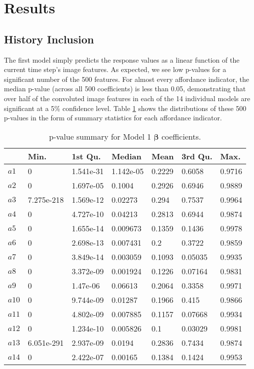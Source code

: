 \documentclass[master]{subfiles}
\begin{document}
\section{Results}\label{sec:results}
\subsection{History Inclusion}
The first model simply predicts the response values as a linear function of the current time step's image features.  As expected, we see low p-values for a significant number of the 500 features.  For almost every affordance indicator, the median p-value (across all 500 coefficients) is less than 0.05, demonstrating that over half of the convoluted image features in each of the 14 individual models are significant at a 5\% confidence level.  Table \ref{table:p1} shows the distributions of these 500 p-values in the form of summary statistics for each affordance indicator.
\begin{table}[H]
\centering
\caption{p-value summary for Model 1  $\bm{\beta}$ coefficients.}
\begin{tabular}{@{}lllllll@{}}
\toprule
    & Min.       & 1st Qu.   & Median    & Mean   & 3rd Qu. & Max.   \\ \midrule
$a1$  & 0          & 1.541e-31 & 1.142e-05 & 0.2229 & 0.6058  & 0.9716 \\
$a2$  & 0          & 1.697e-05 & 0.1004    & 0.2926 & 0.6946  & 0.9889 \\
$a3$  & 7.275e-218 & 1.569e-12 & 0.02273   & 0.294  & 0.7537  & 0.9964 \\
$a4$  & 0          & 4.727e-10 & 0.04213   & 0.2813 & 0.6944  & 0.9874 \\
$a5$  & 0          & 1.655e-14 & 0.009673  & 0.1359 & 0.1436  & 0.9978 \\
$a6$  & 0          & 2.698e-13 & 0.007431  & 0.2    & 0.3722  & 0.9859 \\
$a7$  & 0          & 3.849e-14 & 0.003059  & 0.1093 & 0.05035 & 0.9935 \\
$a8$  & 0          & 3.372e-09 & 0.001924  & 0.1226 & 0.07164 & 0.9831 \\
$a9$  & 0          & 1.47e-06  & 0.06613   & 0.2064 & 0.3358  & 0.9971 \\
$a10$ & 0          & 9.744e-09 & 0.01287   & 0.1966 & 0.415   & 0.9866 \\
$a11$ & 0          & 4.802e-09 & 0.007885  & 0.1157 & 0.07668 & 0.9934 \\
$a12$ & 0          & 1.234e-10 & 0.005826  & 0.1    & 0.03029 & 0.9981 \\
$a13$ & 6.051e-291 & 2.937e-09 & 0.0194    & 0.2836 & 0.7434  & 0.9874 \\
$a14$ & 0          & 2.422e-07 & 0.00165   & 0.1384 & 0.1424  & 0.9953 \\ \bottomrule
\end{tabular}
\label{table:p1}
\end{table}
\end{document}
